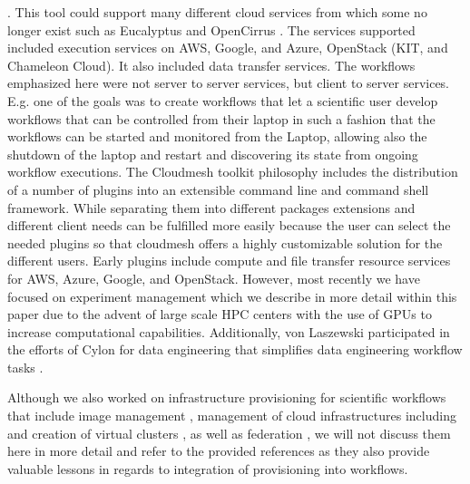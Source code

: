 \documentclass[utf8]{FrontiersinVancouver} %
\begin{document}
\citep{las-04-ftp-journal}
\citep{las-03-ftp}.
This tool could support many different cloud services from which some no longer exist such as Eucalyptus \cite{eucalyptus} and OpenCirrus \cite{opencirrus}. The services supported included execution services on AWS, Google, and Azure, OpenStack (KIT, and Chameleon Cloud). It also included data transfer services. The workflows emphasized here were not server to server services, but client to server services. E.g. one of the goals was to create workflows that let a scientific user develop workflows that can be controlled from their laptop in such a fashion that the workflows can be started and monitored from the Laptop, allowing also the shutdown of the laptop and restart and discovering its state from ongoing workflow executions. 
The Cloudmesh toolkit \citep{las-17-cloudmesh} philosophy includes the distribution of a number of plugins into an extensible command line and command shell framework. While separating them into different packages extensions and different client needs can be fulfilled more easily because the user can select the needed plugins so that cloudmesh offers a highly customizable solution for the different users. Early plugins include compute and file transfer resource services for AWS, Azure, Google, and OpenStack. However, most recently we have focused on experiment management which we describe in more detail within this paper due to the advent of large scale HPC centers with the use of GPUs to increase computational capabilities. 
Additionally, von Laszewski participated in the efforts of Cylon for data engineering that simplifies data engineering workflow tasks \citep{cylon,cylon-radical}. 

Although we also worked on infrastructure provisioning for scientific
workflows that include image management
\citep{las-12-imagemanagement}, management of cloud infrastructures
including \citep{las-20-10gce,las-14-bigdata,las-12-fg-bookchapter}
\citep{las-17-futuregrid} and creation of virtual clusters
\citep{las-16-virtcluster,las-19-harc-comet}, as well as federation
\citep{las-08-federated-cloud}, we will not discuss them here in more
detail and refer to the provided references as they also provide
valuable lessons in regards to integration of provisioning into
workflows.


\end{document}
